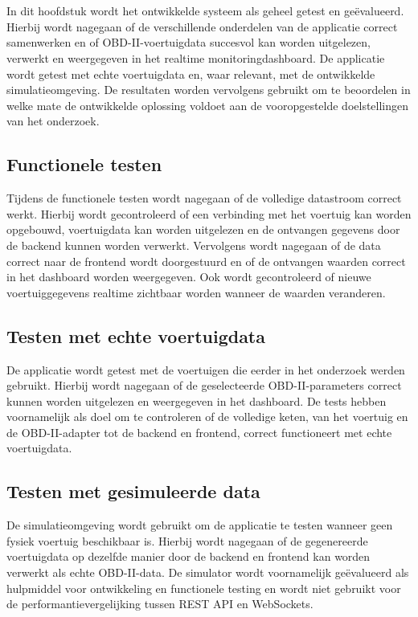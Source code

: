 \chapter{}%
\label{ch:testing-en-evaluatie-van-het-systeem}
In dit hoofdstuk wordt het ontwikkelde systeem als geheel getest en geëvalueerd. Hierbij wordt nagegaan of de verschillende onderdelen van de applicatie correct samenwerken en of OBD-II-voertuigdata succesvol kan worden uitgelezen, verwerkt en weergegeven in het realtime monitoringdashboard.
De applicatie wordt getest met echte voertuigdata en, waar relevant, met de ontwikkelde simulatieomgeving. De resultaten worden vervolgens gebruikt om te beoordelen in welke mate de ontwikkelde oplossing voldoet aan de vooropgestelde doelstellingen van het onderzoek.

\section{Functionele testen}
Tijdens de functionele testen wordt nagegaan of de volledige datastroom correct werkt. Hierbij wordt gecontroleerd of een verbinding met het voertuig kan worden opgebouwd, voertuigdata kan worden uitgelezen en de ontvangen gegevens door de backend kunnen worden verwerkt.
Vervolgens wordt nagegaan of de data correct naar de frontend wordt doorgestuurd en of de ontvangen waarden correct in het dashboard worden weergegeven. Ook wordt gecontroleerd of nieuwe voertuiggegevens realtime zichtbaar worden wanneer de waarden veranderen.

\section{Testen met echte voertuigdata}
De applicatie wordt getest met de voertuigen die eerder in het onderzoek werden gebruikt. Hierbij wordt nagegaan of de geselecteerde OBD-II-parameters correct kunnen worden uitgelezen en weergegeven in het dashboard.
De tests hebben voornamelijk als doel om te controleren of de volledige keten, van het voertuig en de OBD-II-adapter tot de backend en frontend, correct functioneert met echte voertuigdata.
\section{Testen met gesimuleerde data}
De simulatieomgeving wordt gebruikt om de applicatie te testen wanneer geen fysiek voertuig beschikbaar is. Hierbij wordt nagegaan of de gegenereerde voertuigdata op dezelfde manier door de backend en frontend kan worden verwerkt als echte OBD-II-data.
De simulator wordt voornamelijk geëvalueerd als hulpmiddel voor ontwikkeling en functionele testing en wordt niet gebruikt voor de performantievergelijking tussen REST API en WebSockets.


